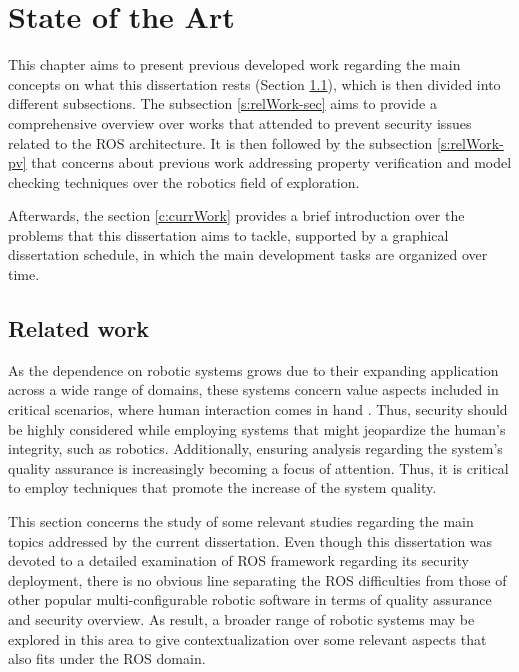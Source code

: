 \chapter{State of the Art}\label{c:stateofArt}

This chapter aims to present previous developed work regarding the main concepts on what this dissertation rests (Section \ref{c:relWork}), which is then divided into different subsections. The subsection \ref{s:relWork-sec} aims to provide a comprehensive overview over works that attended to prevent security issues related to the ROS architecture. %
It is then followed by the subsection %
\ref{s:relWork-pv} that concerns about previous work addressing property verification and model checking techniques over the robotics field of exploration.

Afterwards, the section \ref{c:currWork} provides a brief introduction over the problems that this dissertation aims to tackle, supported by a graphical dissertation schedule, in which the main development tasks are organized over time.

\section{Related work}\label{c:relWork}


As the dependence on robotic systems grows due to their expanding application across a wide range of domains, these systems concern value aspects included in critical scenarios, where human interaction comes in hand \cite{diluoffo2018robot}. Thus, security should be highly considered while employing systems that might jeopardize the human's integrity, such as robotics. Additionally, ensuring analysis regarding the system's quality assurance is increasingly becoming a focus of attention. Thus, it is critical to employ techniques that promote the increase of the system quality.

This section concerns the study of some relevant studies regarding the main topics addressed by the current dissertation. Even though this dissertation was devoted to a detailed examination of ROS framework regarding its security deployment, there is no obvious line separating the ROS difficulties from those of other popular multi-configurable robotic software in terms of quality assurance and security overview. As result, a broader range of robotic systems may be explored in this area to give contextualization over some relevant aspects that also fits under the ROS domain.

